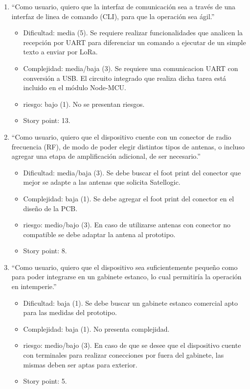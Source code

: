 \documentclass[
11pt, %
codirector, %
]{charter}
\begin{document}
\begin{enumerate}
\vspace{5mm}
		
	\item “Como usuario, quiero que la interfaz de comunicación sea a través de una interfaz de linea de comando (CLI), para que la operación sea ágil.”
		\begin{itemize}
		\item Dificultad: media (5). Se requiere realizar funcionalidades que analicen la recepción por UART para diferenciar un comando a ejecutar de un simple texto a enviar por LoRa.
		\item Complejidad: media/baja (3). Se requiere una comunicacion UART con conversión a USB. El circuito integrado que realiza dicha tarea está incluido en el módulo Node-MCU.
		\item riesgo: bajo (1). No se presentan riesgos.
		\item Story point: 13.
		\end{itemize}
				
\vspace{5mm}
	
	\item “Como usuario, quiero que el dispositivo cuente con un conector de radio frecuencia (RF), de modo de poder elegir distintos tipos de antenas, o incluso agregar una etapa de amplificación adicional, de ser necesario.”
		\begin{itemize}
		\item Dificultad: media/baja (3). Se debe buscar el foot print del conector que mejor se adapte a las antenas que solicita Satellogic.
		\item Complejidad: baja (1). Se debe agregar el foot print del conector en el diseño de la PCB.
		\item riesgo: medio/bajo (3). En caso de utilizarse antenas con conector no compatible se debe adaptar la antena al prototipo.
		\item Story point: 8.
		\end{itemize}
				
\vspace{5mm}
	
	\item “Como usuario, quiero que el dispositivo sea suficientemente pequeño como para poder integrarse en un gabinete estanco, lo cual permitiría la operación en intemperie.”
		\begin{itemize}
		\item Dificultad: baja (1). Se debe buscar un gabinete estanco comercial apto para las medidas del prototipo.
		\item Complejidad: baja (1). No presenta complejidad.
		\item riesgo: medio/bajo (3). En caso de que se desee que el dispositivo cuente con terminales para realizar conecciones por fuera del gabinete, las mismas deben ser aptas para exterior.
		\item Story point: 5.
		\end{itemize}
\end{enumerate}
\end{document}
